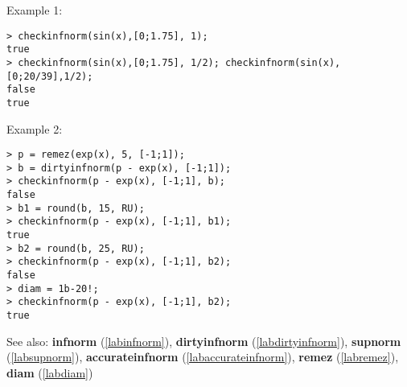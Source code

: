\noindent Example 1: 
\begin{center}\begin{minipage}{15cm}\begin{Verbatim}[frame=single]
> checkinfnorm(sin(x),[0;1.75], 1);
true
> checkinfnorm(sin(x),[0;1.75], 1/2); checkinfnorm(sin(x),[0;20/39],1/2);
false
true
\end{Verbatim}
\end{minipage}\end{center}
\noindent Example 2: 
\begin{center}\begin{minipage}{15cm}\begin{Verbatim}[frame=single]
> p = remez(exp(x), 5, [-1;1]);
> b = dirtyinfnorm(p - exp(x), [-1;1]);
> checkinfnorm(p - exp(x), [-1;1], b);
false
> b1 = round(b, 15, RU);
> checkinfnorm(p - exp(x), [-1;1], b1);
true
> b2 = round(b, 25, RU);
> checkinfnorm(p - exp(x), [-1;1], b2);
false
> diam = 1b-20!;
> checkinfnorm(p - exp(x), [-1;1], b2);
true
\end{Verbatim}
\end{minipage}\end{center}
See also: \textbf{infnorm} (\ref{labinfnorm}), \textbf{dirtyinfnorm} (\ref{labdirtyinfnorm}), \textbf{supnorm} (\ref{labsupnorm}), \textbf{accurateinfnorm} (\ref{labaccurateinfnorm}), \textbf{remez} (\ref{labremez}), \textbf{diam} (\ref{labdiam})

